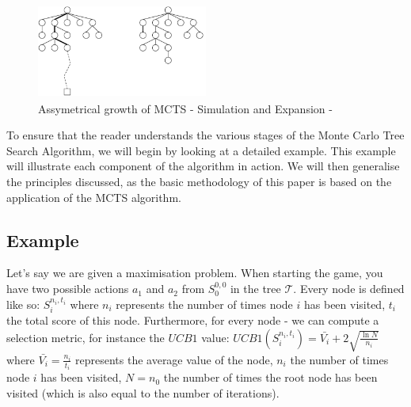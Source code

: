 \begin{figure}[!ht]
    \centering
    \includegraphics[width=0.5\textwidth]{Figures/assymetric_growth_mcts_tree.png}
    \caption{Assymetrical growth of MCTS - Simulation and Expansion - \cite{mcts_assymetrical_growth}}
    \label{fig:Assymetrical_growth_MCTS}
\end{figure}
To ensure that the reader understands the various stages of the Monte Carlo Tree Search Algorithm, we will begin by looking at a detailed example. This example will illustrate each component of the algorithm in action. We will then generalise the principles discussed, as the basic methodology of this paper is based on the application of the MCTS algorithm.


\subsection{Example}
\label{Example}
Let's say we are given a maximisation problem. When starting the game, you have two possible actions $a_1$ and $a_2$ from $S^{0,0}_0$ in the tree $\mathcal{T}$.
Every node is defined like so: $S^{n_i,t_i}_i$ where $n_i$ represents the number of times node $i$ has been visited, $t_i$ the total score of this node.
Furthermore, for every node - we can compute a selection metric, for instance the $UCB1$ value: $UCB1(S^{n_i,t_i}_i)=\bar{V_i} + 2 \sqrt{\frac{\ln N}{n_i}}$ where $\bar{V_i}=\frac{n_i}{t_i}$ represents the average value of the node, $n_i$ the number of times node $i$ has been visited, $N=n_0$ the number of times the root node has been visited (which is also equal to the number of iterations).

